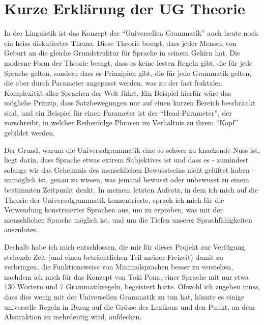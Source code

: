 \documentclass{article}
\begin{document}
\section{Kurze Erklärung der UG Theorie}
In der Linguistik ist das Konzept der ``Universellen Grammatik'' auch heute noch ein heiss diskutiertes Thema.
Diese Theorie besagt, dass jeder Mensch von Geburt an die gleiche Grundstruktur für Sprache in seinem Gehirn hat.
Die moderne Form der Theorie besagt, dass es keine festen Regeln gibt, die für jede Sprache gelten,
sondern dass es Prinzipien gibt, die für jede Grammatik gelten, die aber durch Parameter angepasst werden,
was zu der fast fraktalen Komplexität aller Sprachen der Welt führt. Ein Beispiel hierfür wäre das mögliche Prinzip,
dass Satzbewegungen nur auf einen kurzen Bereich beschränkt sind, und ein Beispiel für einen Parameter ist der ``Head-Parameter'',
der vorschreibt, in welcher Reihenfolge Phrasen im Verhältnis zu ihrem ``Kopf'' gebildet werden.\cite{ChUGAI}

Der Grund, warum die Universalgrammatik eine so schwer zu knackende Nuss ist, liegt darin, dass Sprache etwas extrem Subjektives
ist und dass es - zumindest solange wir das Geheimnis des menschlichen Bewusstseins nicht gelüftet haben - unmöglich ist,
genau zu wissen, was jemand bewusst oder unbewusst zu einem bestimmten Zeitpunkt denkt. In meinem letzten Aufsatz,
in dem ich mich auf die Theorie der Universalgrammatik konzentrierte, sprach ich mich für die Verwendung konstruierter Sprachen aus,
um zu erproben, was mit der menschlichen Sprache möglich ist, und um die Tiefen unserer Sprachfähigkeiten auszuloten.

Deshalb habe ich mich entschlossen, die mir für dieses Projekt zur Verfügung stehende Zeit (und einen beträchtlichen
Teil meiner Freizeit) damit zu verbringen, die Funktionsweise von Minimalsprachen besser zu verstehen,
nachdem ich mich für das Konzept von Toki Pona, einer Sprache mit nur etwa 130 Wörtern und 7 Grammatikregeln\cite{Lang14},
begeistert hatte. Obwohl ich zugeben muss, dass dies wenig mit der Universellen Grammatik zu tun hat,
könnte es einige universelle Regeln in Bezug auf die Grösse des Lexikons und den Punkt,
an dem Abstraktion zu mehrdeutig wird, aufdecken.
\end{document}
